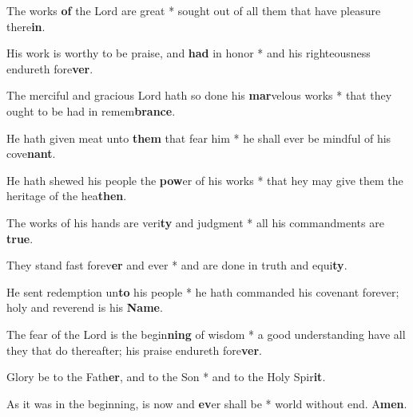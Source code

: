 \begin{multicols}{2}
	The works \textbf{of} the Lord are great * sought out of all them that have pleasure there\textbf{in}.
	
	His work is worthy to be praise, and \textbf{had} in honor * and his righteousness endureth fore\textbf{ver}.
	
	The merciful and gracious Lord hath so done his \textbf{mar}velous works * that they ought to be had in remem\textbf{brance}.
	
	He hath given meat unto \textbf{them} that fear him * he shall ever be mindful of his cove\textbf{nant}.
	
	He hath shewed his people the \textbf{pow}er of his works * that hey may give them the heritage of the hea\textbf{then}.
	
	The works of his hands are veri\textbf{ty} and judgment * all his commandments are \textbf{true}.
	
	They stand fast forev\textbf{er} and ever * and are done in truth and equi\textbf{ty}.
	
	He sent redemption un\textbf{to} his people * he hath commanded his covenant forever; holy and reverend is his \textbf{Name}.
	
	The fear of the Lord is the begin\textbf{ning} of wisdom * a good understanding have all they that do thereafter; his praise endureth fore\textbf{ver}.
	
	Glory be to the Fath\textbf{er}, and to the Son * and to the Holy Spir\textbf{it}.
	
	As it was in the beginning, is now and \textbf{ev}er shall be * world without end. A\textbf{men}.
\end{multicols}